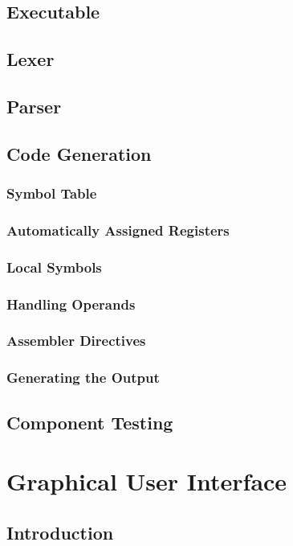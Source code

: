 \documentclass[a4paper,11pt]{report}
\begin{document}
\section{Executable}
\section{Lexer}
\section{Parser}
\section{Code Generation}
\subsection{Symbol Table}
\subsection{Automatically Assigned Registers}
\subsection{Local Symbols}
\subsection{Handling Operands}
\subsection{Assembler Directives}
\subsection{Generating the Output}
\section{Component Testing}
\chapter{Graphical User Interface}
\section{Introduction}
\end{document}
